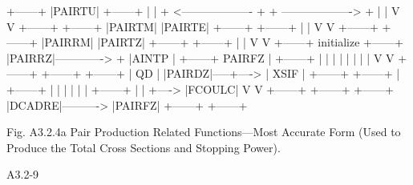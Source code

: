 \begin{center}
\begin{boxedverbatim}




                         +------+
                         |PAIRTU|
                         +------+
                           |  |
    + <------------------- +  + -------------------> +
    |                                                |
    V                                                V
 +------+                                        +------+
 |PAIRTM|                                        |PAIRTE|
 +------+                                        +------+
    |                                                |
    V                                                V
 +------+                                        +------+
 |PAIRRM|                                        |PAIRTZ|
 +------+                                        +------+
    |                                                |
    V                                                V
 +------+   initialize                           +------+
 |PAIRRZ|-------------> +                        |AINTP |
 +------+     PAIRFZ    |                        +------+
    |                   |
    |                   |
    |                   |
    |                   |
    V                   V
 +------+            +------+            +------+
 |  QD  |            |PAIRDZ|-----+----> | XSIF |
 +------+            +------+     |      +------+
   |                    |         |
   |                    |         |      +------+
   |                    |         +----> |FCOULC|
   V                    V                +------+
 +------+            +------+
 |DCADRE|----------> |PAIRFZ|
 +------+            +------+


     Fig. A3.2.4a  Pair Production Related Functions---Most
                  Accurate Form (Used to Produce the Total
                  Cross Sections and Stopping Power).


 A3.2-9
\end{boxedverbatim}
\end{center}
\newpage {}
